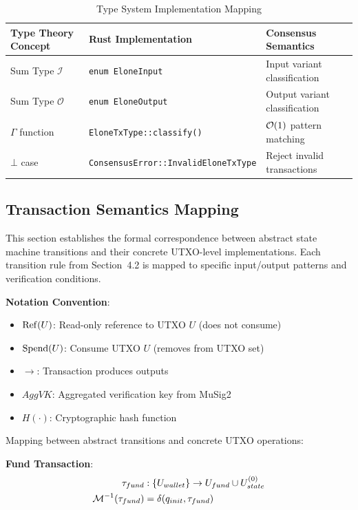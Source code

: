 \begin{table}[htbp]
\centering
\small
\caption{Type System Implementation Mapping}
\begin{tabular}{@{}lll@{}}
\toprule
\textbf{Type Theory Concept} & \textbf{Rust Implementation} & \textbf{Consensus Semantics} \\
\midrule
Sum Type $\mathcal{I}$ & \texttt{enum EloneInput} & Input variant classification \\
Sum Type $\mathcal{O}$ & \texttt{enum EloneOutput} & Output variant classification \\
$\Gamma$ function & \texttt{EloneTxType::classify()} & $\mathcal{O}(1)$ pattern matching \\
$\bot$ case & \texttt{ConsensusError::InvalidEloneTxType} & Reject invalid transactions \\
\bottomrule
\end{tabular}
\end{table}

\subsection{Transaction Semantics Mapping}

This section establishes the formal correspondence between abstract state machine transitions and their concrete UTXO-level implementations. Each transition rule from Section~4.2 is mapped to specific input/output patterns and verification conditions.

\textbf{Notation Convention}:
\begin{itemize}
    \item $\operatorname{Ref}(U)$: Read-only reference to UTXO $U$ (does not consume)
    \item $\operatorname{Spend}(U)$: Consume UTXO $U$ (removes from UTXO set)
    \item $\to$: Transaction produces outputs
    \item $AggVK$: Aggregated verification key from MuSig2
    \item $H(\cdot)$: Cryptographic hash function
\end{itemize}

Mapping between abstract transitions and concrete UTXO operations:

\textbf{Fund Transaction}:
\begin{align*}
\tau_{fund}&: \{U_{wallet}\} \to U_{fund} \cup U_{state}^{(0)} \\
\mathcal{M}^{-1}(\tau_{fund}) &= \delta(q_{init}, \tau_{fund})
\end{align*}

